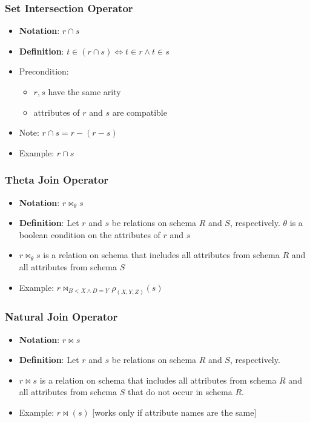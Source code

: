 \subsubsection{Set Intersection Operator}
\begin{itemize}
    \item \textbf{Notation}: $r \cap s$
    \item \textbf{Definition}: $t \in (r \cap s) \Leftrightarrow t \in r \land t \in s$
    \item Precondition:
    \begin{itemize}
        \item $r,s$ have the same arity
        \item attributes of $r$ and $s$ are compatible
    \end{itemize}
    \item Note: $r \cap s = r-(r-s)$
    \item Example: $r \cap s$
\end{itemize}

\subsubsection{Theta Join Operator}
\begin{itemize}
    \item \textbf{Notation}: $r \bowtie_\theta s$
    \item \textbf{Definition}: Let $r$ and $s$ be relations on schema $R$ and $S$, respectively. $\theta$ is a boolean condition on the attributes of $r$ and $s$
    \item $r \bowtie_\theta s$ is a relation on schema that includes all attributes from schema $R$ and all attributes from schema $S$
    \item Example: $r \bowtie_{B<X\land D = Y} \rho_{(X,Y,Z)} (s)$
\end{itemize}

\subsubsection{Natural Join Operator}
\begin{itemize}
    \item \textbf{Notation}: $r \bowtie s$
    \item \textbf{Definition}: Let $r$ and $s$ be relations on schema $R$ and $S$, respectively.
    \item $r \bowtie s$ is a relation on schema that includes all attributes from schema $R$ and all attributes from schema $S$ that do not occur in schema $R$.
    \item Example: $r \bowtie (s)$ [works only if attribute names are the same]
\end{itemize}

